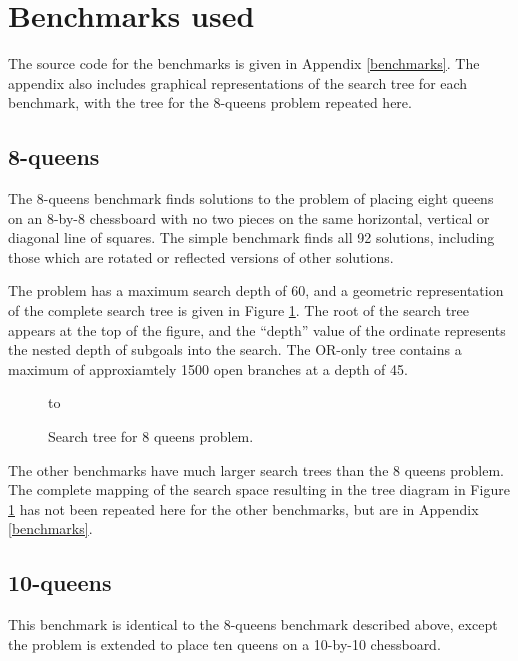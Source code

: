 \section{Benchmarks used} %

The source code for the benchmarks is given in Appendix \ref{benchmarks}. The
appendix also includes graphical representations of the search tree for
each benchmark, with the tree for the 8-queens problem repeated here.

\subsection{8-queens}

The 8-queens benchmark finds solutions to the problem of placing eight queens on
an  8-by-8 chessboard with no two pieces on the same horizontal, vertical or
diagonal line of squares.  The simple benchmark finds all 92 solutions,
including those which are rotated or reflected versions of other solutions.

The problem has a maximum search depth of 60, and a geometric representation of
the complete search tree is given in Figure \ref{q8_tree}.  The root of the
search tree appears at the top of the figure, and the ``depth'' value
of the ordinate represents the nested depth of subgoals into the search.
The OR-only tree contains a maximum of approxiamtely 1500 open branches at
a depth of 45.

\begin{figure}[htb]
\vspace{5mm} \hbox to 
\caption{Search tree for 8 queens problem.}
\vspace{5mm}
\label{q8_tree}
\end{figure}

The other benchmarks have much larger search trees than the 8 queens problem.
The complete mapping of
the search space resulting in the tree diagram in Figure \ref{q8_tree} has not been
repeated here for the other benchmarks, but are in Appendix \ref{benchmarks}.

\subsection{10-queens}

This benchmark is identical to the 8-queens benchmark described above, except
the problem is extended to place ten queens on a 10-by-10 chessboard.

